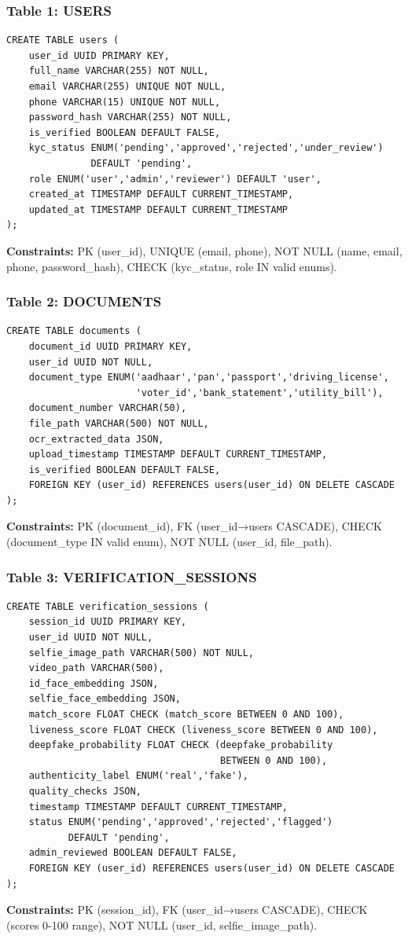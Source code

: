 \documentclass[12pt,a4paper]{article}
\begin{document}
\subsubsection{Table 1: USERS}
\begin{verbatim}
CREATE TABLE users (
    user_id UUID PRIMARY KEY,
    full_name VARCHAR(255) NOT NULL,
    email VARCHAR(255) UNIQUE NOT NULL,
    phone VARCHAR(15) UNIQUE NOT NULL,
    password_hash VARCHAR(255) NOT NULL,
    is_verified BOOLEAN DEFAULT FALSE,
    kyc_status ENUM('pending','approved','rejected','under_review') 
               DEFAULT 'pending',
    role ENUM('user','admin','reviewer') DEFAULT 'user',
    created_at TIMESTAMP DEFAULT CURRENT_TIMESTAMP,
    updated_at TIMESTAMP DEFAULT CURRENT_TIMESTAMP
);
\end{verbatim}
\textbf{Constraints:} PK (user\_id), UNIQUE (email, phone), NOT NULL (name, email, phone, password\_hash), CHECK (kyc\_status, role IN valid enums).

\subsubsection{Table 2: DOCUMENTS}
\begin{verbatim}
CREATE TABLE documents (
    document_id UUID PRIMARY KEY,
    user_id UUID NOT NULL,
    document_type ENUM('aadhaar','pan','passport','driving_license',
                       'voter_id','bank_statement','utility_bill'),
    document_number VARCHAR(50),
    file_path VARCHAR(500) NOT NULL,
    ocr_extracted_data JSON,
    upload_timestamp TIMESTAMP DEFAULT CURRENT_TIMESTAMP,
    is_verified BOOLEAN DEFAULT FALSE,
    FOREIGN KEY (user_id) REFERENCES users(user_id) ON DELETE CASCADE
);
\end{verbatim}
\textbf{Constraints:} PK (document\_id), FK (user\_id→users CASCADE), CHECK (document\_type IN valid enum), NOT NULL (user\_id, file\_path).

\subsubsection{Table 3: VERIFICATION\_SESSIONS}
\begin{verbatim}
CREATE TABLE verification_sessions (
    session_id UUID PRIMARY KEY,
    user_id UUID NOT NULL,
    selfie_image_path VARCHAR(500) NOT NULL,
    video_path VARCHAR(500),
    id_face_embedding JSON,
    selfie_face_embedding JSON,
    match_score FLOAT CHECK (match_score BETWEEN 0 AND 100),
    liveness_score FLOAT CHECK (liveness_score BETWEEN 0 AND 100),
    deepfake_probability FLOAT CHECK (deepfake_probability 
                                      BETWEEN 0 AND 100),
    authenticity_label ENUM('real','fake'),
    quality_checks JSON,
    timestamp TIMESTAMP DEFAULT CURRENT_TIMESTAMP,
    status ENUM('pending','approved','rejected','flagged') 
           DEFAULT 'pending',
    admin_reviewed BOOLEAN DEFAULT FALSE,
    FOREIGN KEY (user_id) REFERENCES users(user_id) ON DELETE CASCADE
);
\end{verbatim}
\textbf{Constraints:} PK (session\_id), FK (user\_id→users CASCADE), CHECK (scores 0-100 range), NOT NULL (user\_id, selfie\_image\_path).
\end{document}
